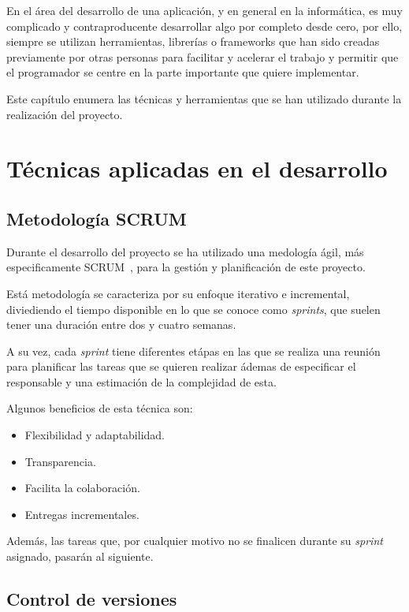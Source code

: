 
En el área del desarrollo de una aplicación, y en general en la informática, es muy complicado y contraproducente desarrollar algo por completo desde cero, por ello, siempre se utilizan herramientas, librerías o frameworks que han sido creadas previamente por otras personas para facilitar y acelerar el trabajo y permitir que el programador se centre en la parte importante que quiere implementar.

Este capítulo enumera las técnicas y herramientas que se han utilizado durante la realización del proyecto.

\section{Técnicas aplicadas en el desarrollo}

\subsection{Metodología SCRUM}

Durante el desarrollo del proyecto se ha utilizado una medología ágil, más especificamente SCRUM~\cite{wearemarketing:scrum}, para la gestión y planificación de este proyecto.

Está metodología se caracteriza por su enfoque iterativo e incremental, diviediendo el tiempo disponible en lo que se conoce como \emph{sprints}, que suelen tener una duración entre dos y cuatro semanas.

A su vez, cada \emph{sprint} tiene diferentes etápas en las que se realiza una reunión para planificar las tareas que se quieren realizar ádemas de especificar el responsable y una estimación de la complejidad de esta.

Algunos beneficios de esta técnica son:
\begin{itemize}
    \item Flexibilidad y adaptabilidad.
    \item Transparencia.
    \item Facilita la colaboración.
    \item Entregas incrementales.
\end{itemize}

Además, las tareas que, por cualquier motivo no se finalicen durante su \emph{sprint} asignado, pasarán al siguiente.

\subsection{Control de versiones}

